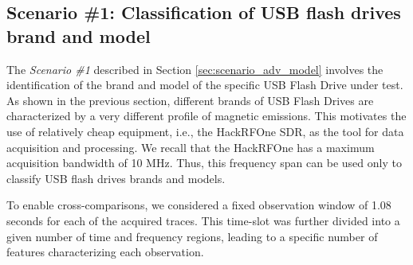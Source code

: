 \documentclass[acmsmall, authorversion]{acmart}
\begin{document}

\subsection{Scenario \#1: Classification of USB flash drives brand and model}
\label{sec:class_usb}

The \emph{Scenario \#1} described in Section \ref{sec:scenario_adv_model} involves the identification of the brand and model of the specific USB Flash Drive under test. As shown in the previous section, different brands of USB Flash Drives are characterized by a very different profile of magnetic emissions. This motivates the use of relatively cheap equipment, i.e., the HackRFOne \ac{SDR}, as the tool for data acquisition and processing. We recall that the HackRFOne has a maximum acquisition bandwidth of 10 MHz. Thus, this frequency span can be used only to classify USB flash drives brands and models.

To enable cross-comparisons, we considered a fixed observation window of 1.08 seconds for each of the acquired traces. This time-slot was further divided into a given number of time and frequency regions, leading to a specific number of features characterizing each observation.
\end{document}
